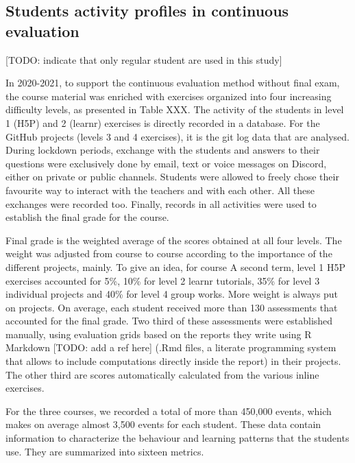 \documentclass[
]{article}
\begin{document}
\hypertarget{students-activity-profiles-in-continuous-evaluation}{%
\subsection{Students activity profiles in continuous
evaluation}\label{students-activity-profiles-in-continuous-evaluation}}

{[}TODO: indicate that only regular student are used in this study{]}

In 2020-2021, to support the continuous evaluation method without final
exam, the course material was enriched with exercises organized into
four increasing difficulty levels, as presented in Table XXX. The
activity of the students in level 1 (H5P) and 2 (learnr) exercises is
directly recorded in a database. For the GitHub projects (levels 3 and 4
exercises), it is the git log data that are analysed. During lockdown
periods, exchange with the students and answers to their questions were
exclusively done by email, text or voice messages on Discord, either on
private or public channels. Students were allowed to freely chose their
favourite way to interact with the teachers and with each other. All
these exchanges were recorded too. Finally, records in all activities
were used to establish the final grade for the course.

Final grade is the weighted average of the scores obtained at all four
levels. The weight was adjusted from course to course according to the
importance of the different projects, mainly. To give an idea, for
course A second term, level 1 H5P exercises accounted for 5\%, 10\% for
level 2 learnr tutorials, 35\% for level 3 individual projects and 40\%
for level 4 group works. More weight is always put on projects. On
average, each student received more than 130 assessments that accounted
for the final grade. Two third of these assessments were established
manually, using evaluation grids based on the reports they write using R
Markdown {[}TODO: add a ref here{]} (.Rmd files, a literate programming
system that allows to include computations directly inside the report)
in their projects. The other third are scores automatically calculated
from the various inline exercises.

For the three courses, we recorded a total of more than 450,000 events,
which makes on average almost 3,500 events for each student. These data
contain information to characterize the behaviour and learning patterns
that the students use. They are summarized into sixteen metrics.
\end{document}
